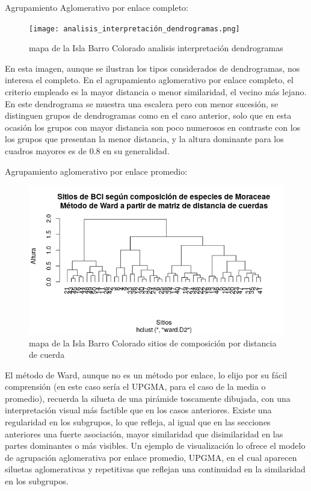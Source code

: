 \documentclass[11pt,]{article}
\begin{document}
Agrupamiento Aglomerativo por enlace completo:

\begin{figure}
\centering
\texttt{[image: analisis\_interpretación\_dendrogramas.png]}
\caption{mapa de la Isla Barro Colorado analisis interpretación
dendrogramas \label{fig:bci_map}}
\end{figure}

En esta imagen, aunque se ilustran los tipos considerados de
dendrogramas, nos interesa el completo. En el agrupamiento aglomerativo
por enlace completo, el criterio empleado es la mayor distancia o menor
similaridad, el vecino más lejano. En este dendrograma se muestra una
escalera pero con menor sucesión, se distinguen grupos de dendrogramas
como en el caso anterior, solo que en esta ocasión los grupos con mayor
distancia son poco numerosos en contraste con los los grupos que
presentan la menor distancia, y la altura dominante para los cuadros
mayores es de 0.8 en su generalidad.

Agrupamiento aglomerativo por enlace promedio:

\begin{figure}
\centering
\includegraphics[width=1.00000\textwidth]{sitios_metodo_ward.png}
\caption{mapa de la Isla Barro Colorado sitios de composición por
distancia de cuerda \label{fig:bci_map}}
\end{figure}

El método de Ward, aunque no es un método por enlace, lo elijo por su
fácil comprensión (en este caso sería el UPGMA, para el caso de la media
o promedio), recuerda la silueta de una pirámide toscamente dibujada,
con una interpretación visual más factible que en los casos anteriores.
Existe una regularidad en los subgrupos, lo que refleja, al igual que en
las secciones anteriores una fuerte asociación, mayor similaridad que
disimilaridad en las partes dominantes o más visibles. Un ejemplo de
visualización lo ofrece el modelo de agrupación aglomerativa por enlace
promedio, UPGMA, en el cual aparecen siluetas aglomerativas y
repetitivas que reflejan una continuidad en la similaridad en los
subgrupos.
\end{document}
